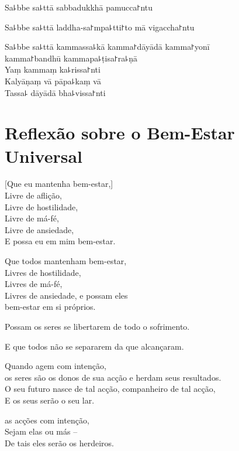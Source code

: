 Sa꜕bbe sa꜕ttā sabbadukkhā pamucca꜓ntu

Sa꜕bbe sa꜕ttā laddha-sa꜓mpa꜕tti꜓to mā vigaccha꜓ntu

Sa꜕bbe sa꜕ttā kammassa꜕kā kamma꜓dāyādā kamma꜓yonī\\
\vin kamma꜓bandhū kammapa꜕ṭisa꜓ra꜕ṇā\\
Yaṃ kammaṃ ka꜕rissa꜓nti\\
Kalyāṇaṃ vā pāpa꜕kaṃ vā\\
Tassa꜕ dāyādā bha꜕vissa꜓nti

\chapter[Bem-Estar Universal]{Reflexão sobre o Bem-Estar Universal}


\begin{leader}
\end{leader}

[Que eu mantenha bem-estar,]\\
Livre de aflição,\\
Livre de hostilidade,\\
Livre de má-fé,\\
Livre de ansiedade,\\
E possa eu  em mim bem-estar.

Que todos mantenham bem-estar,\\
Livres de hostilidade,\\
Livres de má-fé,\\
Livres de ansiedade, e possam eles\\
 bem-estar em si próprios.

Possam  os seres se libertarem de todo o sofrimento.

E que todos não se separarem da  que alcançaram.

Quando agem com intenção,\\
 os seres são os donos de sua acção e herdam seus resultados.\\
O seu futuro nasce de tal acção, companheiro de tal acção,\\
E os seus  serão o seu lar.

 as acções com intenção,\\
Sejam elas  ou más --\\
De tais  eles serão os herdeiros.

